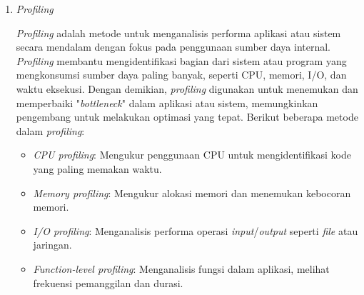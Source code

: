 \documentclass[12pt]{article}
\begin{document}
\begin{enumerate}
\begin{enumerate}
            \item \textit{Profiling}
            \par \textit{Profiling} adalah metode untuk menganalisis performa aplikasi atau sistem secara mendalam dengan fokus pada penggunaan sumber daya internal. \textit{Profiling} membantu mengidentifikasi bagian dari sistem atau program yang mengkonsumsi sumber daya paling banyak, seperti CPU, memori, I/O, dan waktu eksekusi. Dengan demikian, \textit{profiling} digunakan untuk menemukan dan memperbaiki "\textit{bottleneck}" dalam aplikasi atau sistem, memungkinkan pengembang untuk melakukan optimasi yang tepat. Berikut beberapa metode dalam \textit{profiling}:
            \begin{itemize}
                \item \textit{CPU profiling}: Mengukur penggunaan CPU untuk mengidentifikasi kode yang paling memakan waktu.
                \item \textit{Memory profiling}: Mengukur alokasi memori dan menemukan kebocoran memori. 
                \item \textit{I/O profiling}: Menganalisis performa operasi \textit{input}/\textit{output} seperti \textit{file} atau jaringan.
                \item \textit{Function-level profiling}: Menganalisis fungsi dalam aplikasi, melihat frekuensi pemanggilan dan durasi.
            \end{itemize}
            

\end{enumerate}
\end{enumerate}
\end{document}
